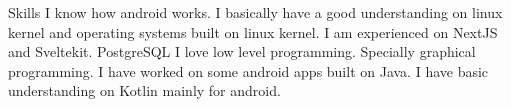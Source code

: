 
\begin{rubric}{Skills}
\entry*[Android]
	I know how android works. I basically have a good understanding on linux kernel and operating systems built on linux kernel.
\entry*[Web]
	I am experienced on NextJS and Sveltekit.
\entry*[Databases]
	PostgreSQL
\entry*[C++]
	I love low level programming. Specially graphical programming.
	\entry*[Java]
	I have worked on some android apps built on Java.
\entry*[Kotlin]
	I have basic understanding on Kotlin mainly for android.
\end{rubric}